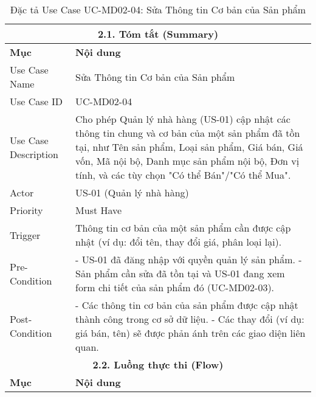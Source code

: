 \begin{longtable}{|m{4cm}|p{11cm}|}
\caption{Đặc tả Use Case UC-MD02-04: Sửa Thông tin Cơ bản của Sản phẩm} \label{tab:uc_md02_04_revised} \\
\hline
\multicolumn{2}{|c|}{\textbf{2.1. Tóm tắt (Summary)}} \\
\hline
\textbf{Mục} & \textbf{Nội dung} \\
\hline
\endhead %
\hline
\endfoot %
\hline
\endlastfoot %
Use Case Name & Sửa Thông tin Cơ bản của Sản phẩm \\
\hline
Use Case ID & UC-MD02-04 \\
\hline
Use Case Description & Cho phép Quản lý nhà hàng (US-01) cập nhật các thông tin chung và cơ bản của một sản phẩm đã tồn tại, như Tên sản phẩm, Loại sản phẩm, Giá bán, Giá vốn, Mã nội bộ, Danh mục sản phẩm nội bộ, Đơn vị tính, và các tùy chọn "Có thể Bán"/"Có thể Mua". \\
\hline
Actor & US-01 (Quản lý nhà hàng) \\
\hline
Priority & Must Have \\
\hline
Trigger & Thông tin cơ bản của một sản phẩm cần được cập nhật (ví dụ: đổi tên, thay đổi giá, phân loại lại). \\
\hline
Pre-Condition & - US-01 đã đăng nhập với quyền quản lý sản phẩm. \newline - Sản phẩm cần sửa đã tồn tại và US-01 đang xem form chi tiết của sản phẩm đó (UC-MD02-03). \\
\hline
Post-Condition & - Các thông tin cơ bản của sản phẩm được cập nhật thành công trong cơ sở dữ liệu. \newline - Các thay đổi (ví dụ: giá bán, tên) sẽ được phản ánh trên các giao diện liên quan. \\
\hline
\multicolumn{2}{|c|}{\textbf{2.2. Luồng thực thi (Flow)}} \\
\hline
\textbf{Mục} & \textbf{Nội dung} \\
\hline

\end{longtable}
